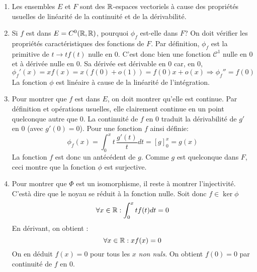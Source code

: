 \begin{enumerate}
 \item Les ensembles $E$ et $F$ sont des $\mathbb{R}$-espaces vectoriels à cause des propriétés usuelles de linéarité de la continuité et de la dérivabilité. 
\item Si $f$ est dans $E=C^0(\mathbb{R},\mathbb{R})$, pourquoi $\phi_f$ est-elle dans $F$? On doit vérifier les propriétés caractéristiques des fonctions de $F$.\newline
Par définition, $\phi_f$ est la primitive de $t\rightarrow tf(t)$ nulle en $0$. C'est donc bien une fonction $\mathcal C^1$ nulle en $0$ et à dérivée nulle en $0$. Sa dérivée est dérivable en $0$ car, en $0$, 
\begin{displaymath}
 \phi_f'(x) = xf(x) = x(f(0)+o(1)) = f(0)x + o(x) \Rightarrow \phi_f'' = f(0)
\end{displaymath}
La fonction $\phi$ est linéaire à cause de la linéarité de l'intégration.

\item Pour montrer que $f$ est dans $E$, on doit montrer qu'elle est continue.\newline
Par définition et opérations usuelles, elle clairement continue en un point quelconque autre que $0$. La continuité de $f$ en $0$ traduit la dérivabilité de $g'$ en $0$ (avec $g'(0)=0$).\newline
Pour une fonction $f$ ainsi définie:
\begin{displaymath}
 \phi_f(x)=\int_{0}^{x}t\, \frac{g'(t)}{t}dt = \left[ g\right]_{0}^{x} =g(x)
\end{displaymath}
La fonction $f$ est donc un antécédent de $g$. Comme  $g$ est quelconque dans $F$, ceci montre que la fonction $\phi$ est surjective.
\item Pour montrer que $\Phi$ est un isomorphisme, il reste à montrer l'injectivité. C'està dire que le noyau se réduit à la fonction nulle. Soit donc $f\in\ker \phi$
\begin{displaymath}
 \forall x\in\mathbb{R} : \int_{0}^{x}tf(t)dt = 0
\end{displaymath}
 En dérivant, on obtient :
\begin{displaymath}
 \forall x\in\mathbb{R} : xf(x)=0
\end{displaymath}
On en déduit $f(x)=0$ pour tous les $x$ \emph{non nuls}. On obtient $f(0)=0$ par continuité de $f$ en $0$.
\end{enumerate}

